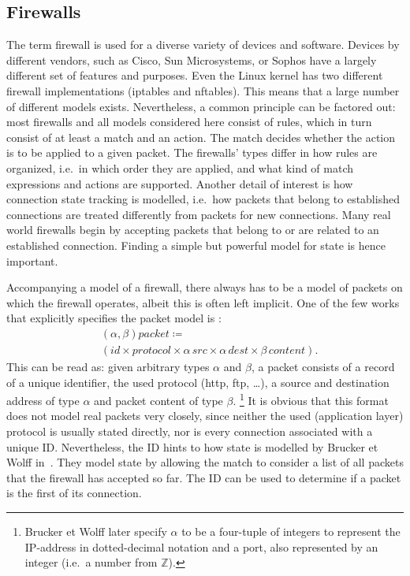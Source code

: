 \subsection{Firewalls}\label{sec:fw}
The term firewall is used for a diverse variety of devices and software.
Devices by different vendors, such as Cisco, Sun Microsystems, or Sophos have a largely different set of features and purposes.
Even the Linux kernel has two different firewall implementations (iptables and nftables).
This means that a large number of different models exists.
Nevertheless, a common principle can be factored out: most firewalls and all models considered here consist of rules, which in turn consist of at least a match and an action.
The match decides whether the action is to be applied to a given packet.
The firewalls' types differ in how rules are organized, i.e.\ in which order they are applied, and what kind of match expressions and actions are supported.
Another detail of interest is how connection state tracking is modelled, i.e.\ how packets that belong to established connections are treated differently from packets for new connections.
Many real world firewalls begin by accepting packets that belong to or are related to an established connection.
Finding a simple but powerful model for state is hence important.

Accompanying a model of a firewall, there always has to be a model of packets on which the firewall operates, albeit this is often left implicit.
One of the few works that explicitly specifies the packet model is \cite{brucker2007test}:
\begin{align}
	&\left(α, β\right) \mathit{packet} \coloneqq \nonumber\\
	&\left(id × protocol × α\, src × α\, dest × β\, content\right) \text{.}
\end{align}
This can be read as: given arbitrary types $α$ and $β$, a packet consists of a record of a unique identifier, the used protocol (http, ftp, …), a source and destination address of type $α$ and packet content of type $β$.%
\footnote{Brucker et Wolff later specify $α$ to be a four-tuple of integers to represent the IP-address in dotted-decimal notation and a port, also represented by an integer (i.e.\ a number from $\mathbb{Z}$).}
It is obvious that this format does not model real packets very closely, since neither the used (application layer) protocol is usually stated directly, nor is every connection associated with a unique ID.
Nevertheless, the ID hints to how state is modelled by Brucker et Wolff in~\cite{brucker2007test}.
They model state by allowing the match to consider a list of all packets that the firewall has accepted so far.
The ID can be used to determine if a packet is the first of its connection.


